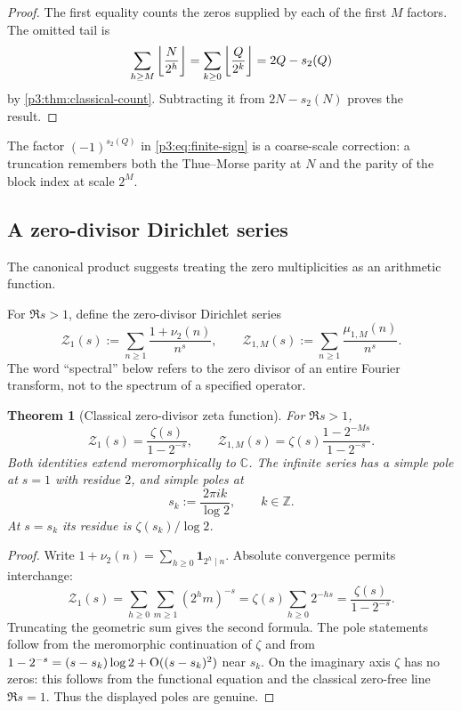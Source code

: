 \documentclass[11pt,oneside]{article}
\newtheorem{theorem}{Theorem}[section]
\theoremstyle{definition}
\theoremstyle{remark}
\newcommand{\C}{\mathbb C}
\newcommand{\Z}{\mathbb Z}
\begin{document}
\begin{proof}
The first equality counts the zeros supplied by each of the first $M$ factors.  The omitted tail is
\[
 \sum_{h\ge M}\left\lfloor \frac N{2^h}\right\rfloor
 =\sum_{k\ge0}\left\lfloor \frac Q{2^k}\right\rfloor
 =2Q-s_2(Q)
\]
by \cref{p3:thm:classical-count}.  Subtracting it from $2N-s_2(N)$ proves the result.
\end{proof}

The factor $(-1)^{s_2(Q)}$ in \eqref{p3:eq:finite-sign} is a coarse-scale correction: a truncation remembers both the Thue--Morse parity at $N$ and the parity of the block index at scale $2^M$.

\subsection{A zero-divisor Dirichlet series}

The canonical product suggests treating the zero multiplicities as an arithmetic function.

\begin{definition}
For $\Re s>1$, define the zero-divisor Dirichlet series
\[
  \mathcal Z_1(s):=\sum_{n\ge1}\frac{1+\nu_2(n)}{n^s},
  \qquad
  \mathcal Z_{1,M}(s):=\sum_{n\ge1}\frac{\mu_{1,M}(n)}{n^s}.
\]
The word ``spectral'' below refers to the zero divisor of an entire Fourier transform, not to the spectrum of a specified operator.
\end{definition}

\begin{theorem}[Classical zero-divisor zeta function]\label{p3:thm:zeta1}
For $\Re s>1$,
\begin{equation}\label{p3:eq:zeta1}
  \mathcal Z_1(s)=\frac{\zeta(s)}{1-2^{-s}},
  \qquad
  \mathcal Z_{1,M}(s)=\zeta(s)\frac{1-2^{-Ms}}{1-2^{-s}}.
\end{equation}
Both identities extend meromorphically to $\C$.  The infinite series has a simple pole at $s=1$ with residue $2$, and simple poles at
\begin{equation}\label{p3:eq:dyadic-lattice}
  s_k:=\frac{2\pi i k}{\log2},\qquad k\in\Z.
\end{equation}
At $s=s_k$ its residue is $\zeta(s_k)/\log2$.
\end{theorem}

\begin{proof}
Write $1+\nu_2(n)=\sum_{h\ge0}\mathbf 1_{2^h\mid n}$.  Absolute convergence permits interchange:
\[
 \mathcal Z_1(s)=\sum_{h\ge0}\sum_{m\ge1}(2^hm)^{-s}
 =\zeta(s)\sum_{h\ge0}2^{-hs}
 =\frac{\zeta(s)}{1-2^{-s}}.
\]
Truncating the geometric sum gives the second formula.  The pole statements follow from the meromorphic continuation of $\zeta$ and from
$1-2^{-s}=(s-s_k)\log2+\mathrm O((s-s_k)^2)$ near $s_k$.  On the imaginary axis $\zeta$ has no zeros: this follows from the functional equation and the classical zero-free line $\Re s=1$.  Thus the displayed poles are genuine.
\end{proof}
\end{document}
